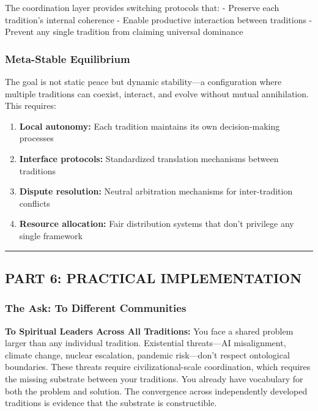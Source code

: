 \documentclass[
]{article}
\providecommand{\tightlist}{%
  \setlength{\itemsep}{0pt}\setlength{\parskip}{0pt}}
\begin{document}
The coordination layer provides switching protocols that: - Preserve
each tradition's internal coherence - Enable productive interaction
between traditions - Prevent any single tradition from claiming
universal dominance

\subsubsection{Meta-Stable Equilibrium}\label{meta-stable-equilibrium}

The goal is not static peace but dynamic stability---a configuration
where multiple traditions can coexist, interact, and evolve without
mutual annihilation. This requires:

\begin{enumerate}
\def\labelenumi{\arabic{enumi}.}
\tightlist
\item
  \textbf{Local autonomy:} Each tradition maintains its own
  decision-making processes
\item
  \textbf{Interface protocols:} Standardized translation mechanisms
  between traditions\\
\item
  \textbf{Dispute resolution:} Neutral arbitration mechanisms for
  inter-tradition conflicts
\item
  \textbf{Resource allocation:} Fair distribution systems that don't
  privilege any single framework
\end{enumerate}

\begin{center}\rule{0.5\linewidth}{0.5pt}\end{center}

\subsection{PART 6: PRACTICAL
IMPLEMENTATION}\label{part-6-practical-implementation}

\subsubsection{The Ask: To Different
Communities}\label{the-ask-to-different-communities}

\textbf{To Spiritual Leaders Across All Traditions:} You face a shared
problem larger than any individual tradition. Existential threats---AI
misalignment, climate change, nuclear escalation, pandemic risk---don't
respect ontological boundaries. These threats require
civilizational-scale coordination, which requires the missing substrate
between your traditions. You already have vocabulary for both the
problem and solution. The convergence across independently developed
traditions is evidence that the substrate is constructible.
\end{document}
